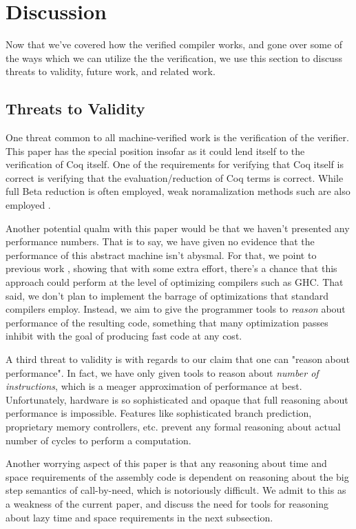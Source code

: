 \section{Discussion}

Now that we've covered how the verified compiler works, and gone over some of
the ways which we can utilize the the verification, we use this section to
discuss threats to validity, future work, and related work. 

\subsection{Threats to Validity}

One threat common to all machine-verified work is the verification of the
verifier. This paper has the special position insofar as it could lend itself to
the verification of Coq itself. One of the requirements for verifying that Coq
itself is correct is verifying that the evaluation/reduction of Coq terms is
correct. While full Beta reduction is often employed, weak noramalization
methods such are also employed \cite{?}.  

Another potential qualm with this paper would be that we haven't presented any
performance numbers. That is to say, we have given no evidence that the
performance of this abstract machine isn't abysmal. For that, we point to
previous work \cite{?}, showing that with some extra effort, there's a chance
that this approach could perform at the level of optimizing compilers such as
GHC. That said, we don't plan to implement the barrage of optimizations that
standard compilers employ. Instead, we aim to give the programmer tools to
\emph{reason} about performance of the resulting code, something that many
optimization passes inhibit with the goal of producing fast code at any cost. 

A third threat to validity is with regards to our claim that one can "reason
about performance". In fact, we have only given tools to reason about \emph{number of
instructions}, which is a meager approximation of performance at best.
Unfortunately, hardware is so sophisticated and opaque that full reasoning about
performance is impossible. Features like sophisticated branch prediction,
proprietary memory controllers, etc. prevent any formal reasoning about actual
number of cycles to perform a computation.  

Another worrying aspect of this paper is that any reasoning about time and space
requirements of the assembly code is dependent on reasoning about the big step
semantics of call-by-need, which is notoriously difficult. We admit to this as a
weakness of the current paper, and discuss the need for tools for reasoning
about lazy time and space requirements in the next subsection.

